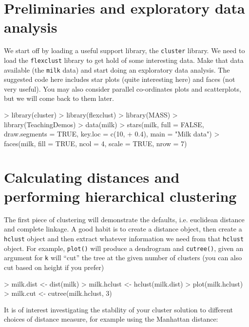 

\section{Preliminaries and exploratory data analysis}

We start off by loading a useful support library, the \texttt{cluster} library.   We need to load the \texttt{flexclust} library to get hold of some interesting data.   Make that data available (the \texttt{milk} data) and start doing an exploratory data analysis.   The suggested code here includes star plots (quite interesting here) and faces (not very useful).   You may also consider parallel co-ordinates plots and scatterplots, but we will come back to them later.

\begin{Schunk}
\begin{Sinput}
> library(cluster)
> library(flexclust)
> library(MASS)
> library(TeachingDemos)
> data(milk)
> stars(milk, full = FALSE, draw.segments = TRUE, key.loc = c(10, 
+     0.4), main = "Milk data")
> faces(milk, fill = TRUE, ncol = 4, scale = TRUE, nrow = 7)
\end{Sinput}
\end{Schunk}


\section{Calculating distances and performing hierarchical clustering}

The first piece of clustering will demonstrate the defaults, i.e. euclidean distance and complete linkage.   A good habit is to create a distance object, then create a \texttt{hclust} object and then extract whatever information we need from that \texttt{hclust} object.   For example, \texttt{plot()} will produce a dendrogram and \texttt{cutree()}, given an argument for \texttt{k} will ``cut'' the tree at the given number of clusters (you can also cut based on height if you prefer)

\begin{Schunk}
\begin{Sinput}
> milk.dist <- dist(milk)
> milk.hclust <- hclust(milk.dist)
> plot(milk.hclust)
> milk.cut <- cutree(milk.hclust, 3)
\end{Sinput}
\end{Schunk}


It is of interest investigating the stability of your cluster solution to different choices of distance measure, for example using the Manhattan distance:

